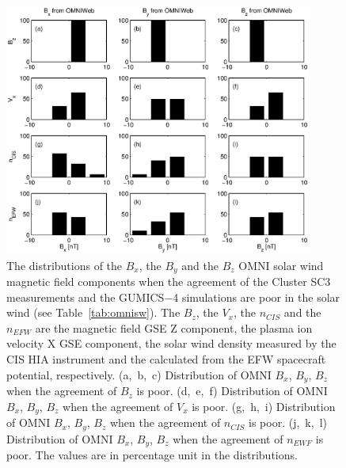 \documentclass[linenumbers,draft]{agujournal}
\begin{document}
\pagebreak

\begin{figure}[h]
\centering
\includegraphics[width=0.9\textwidth,angle=0]{swe-2020-corr-f14.eps}  
\caption{The distributions of the $B_{x}$, the $B_{y}$  and the $B_{z}$ OMNI solar wind magnetic field components when the agreement of the Cluster SC3 measurements and the GUMICS$-$4 simulations are poor in the solar wind (see Table~\ref{tab:omnisw}). The $B_{z}$, the $V_{x}$, the $n_{CIS}$ and the $n_{EFW}$ are the magnetic field GSE Z component, the plasma ion velocity X GSE component, the  solar wind density measured by the CIS HIA instrument and the calculated from the EFW spacecraft potential, respectively. (a,~b,~c) Distribution of OMNI $B_{x}$, $B_{y}$, $B_{z}$ when the agreement of $B_{z}$ is poor. (d,~e,~f) Distribution of OMNI  $B_{x}$, $B_{y}$, $B_{z}$ when the agreement of $V_{x}$ is poor. (g,~h,~i) Distribution of OMNI $B_{x}$, $B_{y}$, $B_{z}$ when the agreement of $n_{CIS}$ is poor. (j,~k,~l) Distribution of OMNI $B_{x}$, $B_{y}$, $B_{z}$ when the agreement of $n_{EWF}$ is poor. The values are in percentage unit in the distributions.}
\label{fig:swomnibxyz}
\end{figure}

\pagebreak
\end{document}

